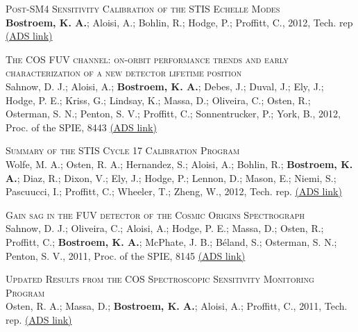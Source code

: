 \begin{revnumerate}[24]
\item{\textsc{Post-SM4 Sensitivity Calibration of the STIS Echelle Modes}\\
{\bf Bostroem, K. A.}; Aloisi, A.; Bohlin, R.; Hodge, P.; Proffitt, C., 2012, Tech. rep 
\color{blue}\href{https://ui.adsabs.harvard.edu/#abs/2012stis.rept....1B/abstract}{(ADS link)}\color{black}}\\%

\item{\textsc{The COS FUV channel: on-orbit performance trends and early characterization of a new detector lifetime position}\\
Sahnow, D. J.; Aloisi, A.; \textbf{Bostroem, K. A.}; Debes, J.; Duval, J.; Ely, J.; Hodge, P. E.; Kriss, G.; Lindsay, K.; Massa, D.; Oliveira, C.; Osten, R.; Osterman, S. N.; Penton, S. V.; Proffitt, C.; Sonnentrucker, P.; York, B., 2012, Proc. of the SPIE, 8443 
\color{blue}\href{https://ui.adsabs.harvard.edu/#abs/2012SPIE.8443E..4CS/abstract}{(ADS link)}\color{black}}\\

\item{\textsc{Summary of the STIS Cycle 17 Calibration Program}\\
Wolfe, M. A.; Osten, R. A.; Hernandez, S.; Aloisi, A.; Bohlin, R.; \textbf{Bostroem, K. A.}; Diaz, R.; Dixon, V.; Ely, J.; Hodge, P.; Lennon, D.; Mason, E.; Niemi, S.; Pascuucci, I.; Proffitt, C.; Wheeler, T.; Zheng, W., 2012, Tech. rep. 
\color{blue}\href{https://ui.adsabs.harvard.edu/#abs/2012stis.rept....3W/abstract}{(ADS link)}\color{black}}\\%

\item{\textsc{Gain sag in the FUV detector of the Cosmic Origins Spectrograph}\\
Sahnow, D. J.; Oliveira, C.; Aloisi, A.; Hodge, P. E.; Massa, D.; Osten, R.; Proffitt, C.; \textbf{Bostroem, K. A.}; McPhate, J. B.; B\'{e}land, S.; Osterman, S. N.; Penton, S. V., 2011,  Proc. of the SPIE, 8145 
\color{blue}\href{https://ui.adsabs.harvard.edu/#abs/2011SPIE.8145E..0QS/abstract}{(ADS link)}\color{black}}\\ %

\item{\textsc{Updated Results from the COS Spectroscopic Sensitivity Monitoring Program}\\
Osten, R. A.; Massa, D.; \textbf{Bostroem, K. A.}; Aloisi, A.; Proffitt, C., 2011, Tech. rep. 
\color{blue}\href{https://ui.adsabs.harvard.edu/#abs/2011cos..rept....2O/abstract}{(ADS link)}\color{black}}\\ %


\end{revnumerate}
